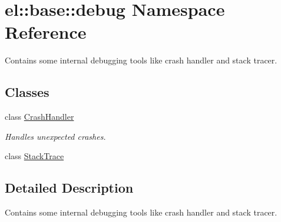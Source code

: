\hypertarget{namespaceel_1_1base_1_1debug}{}\section{el\+:\+:base\+:\+:debug Namespace Reference}
\label{namespaceel_1_1base_1_1debug}


Contains some internal debugging tools like crash handler and stack tracer.  


\subsection*{Classes}
\begin{DoxyCompactItemize}
\item 
class \hyperlink{classel_1_1base_1_1debug_1_1CrashHandler}{Crash\+Handler}
\begin{DoxyCompactList}\small\item\em Handles unexpected crashes. \end{DoxyCompactList}\item 
class \hyperlink{classel_1_1base_1_1debug_1_1StackTrace}{Stack\+Trace}
\end{DoxyCompactItemize}


\subsection{Detailed Description}
Contains some internal debugging tools like crash handler and stack tracer. 